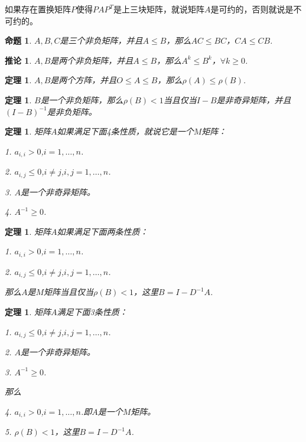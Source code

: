 \documentclass{article}
\begin{document}
如果存在置换矩阵$P$使得$PAP^T$是上三块矩阵，就说矩阵$A$是可约的，否则就说是不可约的。

\newtheorem{proposition}{命题}
\begin{proposition}
$A,B,C$是三个非负矩阵，并且$A\le B$，那么$AC\le BC$，$CA\le CB$.
\end{proposition}

\newtheorem{corollary}{推论}
\begin{corollary}
$A,B$是两个非负矩阵，并且$A\le B$，那么$A^k\le B^k$，$\forall k\ge 0$.
\end{corollary}

\newtheorem{thm}{定理}
\begin{thm}
$A,B$是两个方阵，并且$O\le A\le B$，那么$\rho (A)\le\rho (B)$.
\end{thm}

\newtheorem{thm}{定理}
\begin{thm}
$B$是一个非负矩阵，那么$\rho (B)<1$当且仅当$I-B$是非奇异矩阵，并且$(I-B)^{-1}$是非负矩阵。
\end{thm}

\newtheorem{definition}{定理}
\begin{definition}
矩阵$A$如果满足下面4条性质，就说它是一个$M$矩阵：

1. $a_{i,i}>0$,$i=1,\ldots ,n$.

2. $a_{i,j}\le 0$,$i\neq j$,$i,j=1,\ldots ,n$.

3. $A$是一个非奇异矩阵。

4. $A^{-1}\ge 0$.
\end{definition}

\newtheorem{thm}{定理}
\begin{thm}
矩阵$A$如果满足下面两条性质：

1. $a_{i,i}>0$,$i=1,\ldots ,n$.

2. $a_{i,j}\le 0$,$i\neq j$,$i,j=1,\ldots ,n$.

那么$A$是$M$矩阵当且仅当$\rho (B)<1$，这里$B=I-D^{-1}A$.
\end{thm}

\newtheorem{thm}{定理}
\begin{thm}
矩阵$A$满足下面3条性质：

1. $a_{i,j}\le 0$,$i\neq j$,$i,j=1,\ldots ,n$.

2. $A$是一个非奇异矩阵。

3. $A^{-1}\ge 0$.

那么

4. $a_{i,i}>0$,$i=1,\ldots ,n$.即$A$是一个$M$矩阵。

5. $\rho (B)<1$，这里$B=I-D^{-1}A$.
\end{thm}
\end{document}
